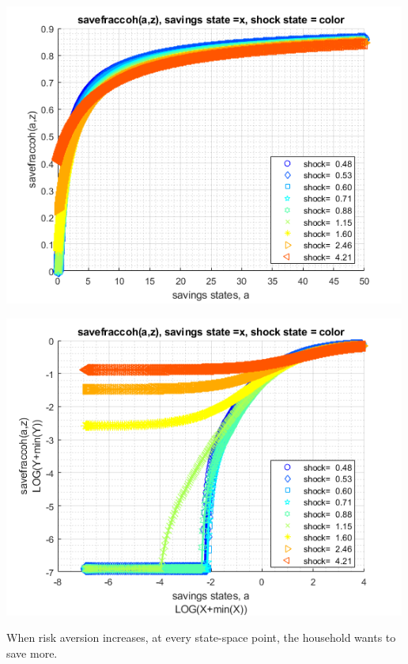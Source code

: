 \documentclass[
]{book}
\begin{document}
\includegraphics[width=5.20833in,height=\textheight]{img/fx_vfi_az_bisec_vec_images/figure_2.png}

\includegraphics[width=5.20833in,height=\textheight]{img/fx_vfi_az_bisec_vec_images/figure_3.png}

When risk aversion increases, at every state-space point, the household
wants to save more.
\end{document}
